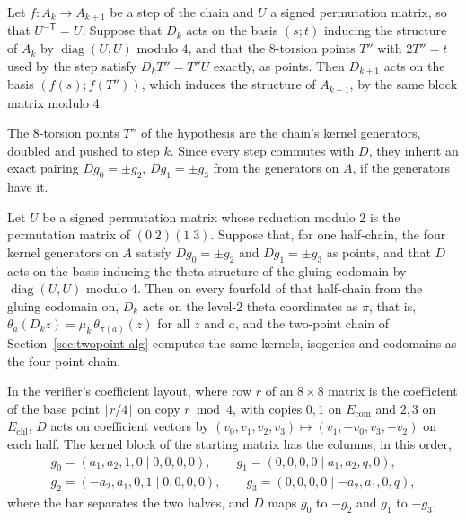 \documentclass[version=preprint]{iacrcc}
\newcommand{\Ecom}{E_{\mathrm{com}}}
\newcommand{\Echl}{E_{\mathrm{chl}}}
\begin{document}
    \begin{lemma}
        \label{lem:onestep}
        Let $f\colon A_k \to A_{k+1}$ be a step of the chain and $U$ a signed
        permutation matrix, so that $U^{-\mathsf T} = U$. Suppose that $D_k$ acts
        on the basis $(s; t)$ inducing the structure of $A_k$ by
        $\operatorname{diag}(U, U)$ modulo 4, and that the 8-torsion points $T''$
        with $2T'' = t$ used by the step satisfy $D_k T'' = T'' U$ exactly, as
        points. Then $D_{k+1}$ acts on the basis $(f(s); f(T''))$, which induces
        the structure of $A_{k+1}$, by the same block matrix modulo 4.
    \end{lemma}


    The 8-torsion points $T''$ of the hypothesis are the chain's kernel
    generators, doubled and pushed to step $k$. Since every step commutes with
    $D$, they inherit an exact pairing $D g_0 = \pm g_2$, $D g_1 = \pm g_3$
    from the generators on $A$, if the generators have it.

    \begin{theorem}
        \label{thm:conditional}
        Let $U$ be a signed permutation matrix whose reduction modulo 2 is the
        permutation matrix of $(0\;2)(1\;3)$. Suppose that, for one half-chain,
        the four kernel generators on $A$ satisfy $D g_0 = \pm g_2$ and $D g_1 =
        \pm g_3$ as points, and that $D$ acts on the basis inducing the theta
        structure of the gluing codomain by $\operatorname{diag}(U, U)$ modulo 4.
        Then on every fourfold of that half-chain from the gluing codomain on,
        $D_k$ acts on the level-2 theta coordinates as $\pi$, that is,
        $\theta_a(D_k z) = \mu_k\, \theta_{\pi(a)}(z)$ for all $z$ and $a$, and the
        two-point chain of Section~\ref{sec:twopoint-alg} computes the same kernels,
        isogenies and codomains as the four-point chain.
    \end{theorem}


    \begin{lemma}
        \label{lem:block}
        In the verifier's coefficient layout, where row $r$ of an $8 \times 8$
        matrix is the coefficient of the base point $\lfloor r/4 \rfloor$ on copy
        $r \bmod 4$, with copies $0, 1$ on $\Ecom$ and $2, 3$ on $\Echl$, $D$ acts
        on coefficient vectors by $(v_0, v_1, v_2, v_3) \mapsto (v_1, -v_0, v_3,
        -v_2)$ on each half. The kernel block of the starting matrix has the
        columns, in this order,
        \begin{gather*}
        g_0 = (a_1, a_2, 1, 0 \mid 0, 0, 0, 0), \qquad
        g_1 = (0, 0, 0, 0 \mid a_1, a_2, q, 0), \\
        g_2 = (-a_2, a_1, 0, 1 \mid 0, 0, 0, 0), \qquad
        g_3 = (0, 0, 0, 0 \mid -a_2, a_1, 0, q),
        \end{gather*}
        where the bar separates the two halves, and $D$ maps $g_0$ to $-g_2$ and
        $g_1$ to $-g_3$.
    \end{lemma}
\end{document}
